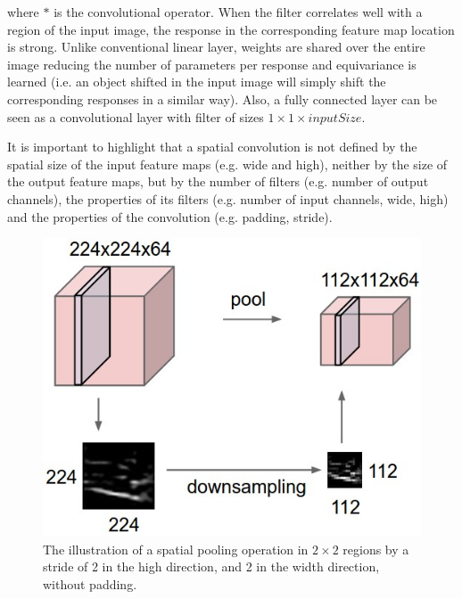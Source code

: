     where $*$ is the convolutional operator. When the filter correlates well with a region of the
    input image, the response in the corresponding feature map location is strong. Unlike
    conventional linear layer, weights are shared over the entire image reducing the number of
    parameters per response and equivariance is learned (i.e. an object shifted in the input image will simply shift the corresponding responses in a similar way). Also, a fully connected layer can be seen as a convolutional layer with filter of sizes $1 \times 1 \times inputSize$.  
    \par
    It is important to highlight that a spatial convolution is not defined by the spatial size
    of the input feature maps (e.g. wide and high), neither by the size of the output feature
    maps, but by the number of filters (e.g. number of output channels), the properties of its
    filters (e.g. number of input channels, wide, high) and the properties of the convolution
    (e.g. padding, stride).
    \begin{figure}[H]
        \centering
        \includegraphics[scale=0.5]{images/spatialpooling.png}
        \caption[Spatial Pooling Operation]{The illustration of a spatial pooling operation in $2 \times 2$ regions by a stride of 2
        in the high direction, and 2 in the width direction, without padding.\cite{DBLP:journals/corr/CadeneTC16}}
        \label{fig:32}
    \end{figure}
    
